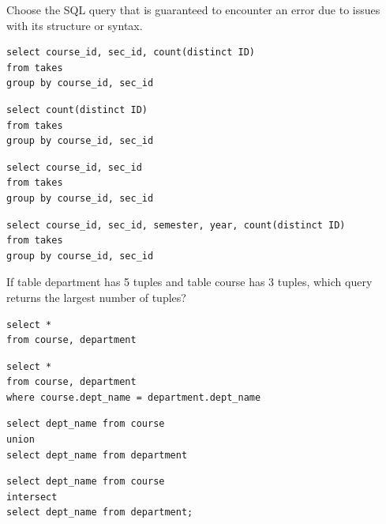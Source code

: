 \documentclass[12pt, addpoints, answers]{exam}
\begin{document}
\begin{questions}
\begin{minipage}{\linewidth}
\question[3]
Choose the SQL query that is guaranteed to encounter an error due to issues with its structure or syntax.\par\vspace{0.5em}
\begin{checkboxes} 
    \choice \begin{verbatim}
select course_id, sec_id, count(distinct ID)
from takes
group by course_id, sec_id
    \end{verbatim}
    \choice \begin{verbatim}
select count(distinct ID)
from takes
group by course_id, sec_id
    \end{verbatim}
    \choice \begin{verbatim}
select course_id, sec_id
from takes
group by course_id, sec_id
    \end{verbatim}
    \CorrectChoice \begin{verbatim}
select course_id, sec_id, semester, year, count(distinct ID)
from takes
group by course_id, sec_id
    \end{verbatim}
\end{checkboxes}
\end{minipage}\vspace{1em}

\begin{minipage}{\linewidth}
\question[4]
If table department has 5 tuples and table course has 3 tuples, which query returns the largest number of tuples?\par\vspace{0.5em}
\begin{checkboxes} 
    \CorrectChoice \begin{verbatim}
select * 
from course, department
    \end{verbatim}
    \choice \begin{verbatim}
select * 
from course, department
where course.dept_name = department.dept_name
    \end{verbatim}
    \choice \begin{verbatim}
select dept_name from course
union
select dept_name from department
    \end{verbatim}
    \choice \begin{verbatim}
select dept_name from course
intersect
select dept_name from department;
    \end{verbatim}

\end{checkboxes}
\end{minipage}\vspace{1em}


\end{questions}
\end{document}
